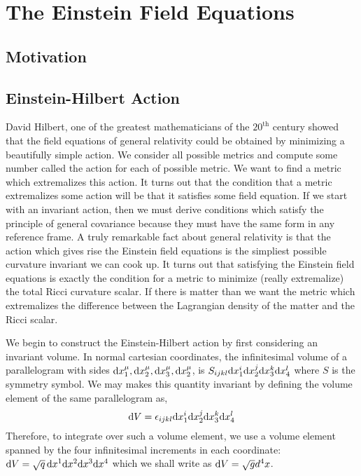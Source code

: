 \documentclass[11pt, a4paper]{article}
\begin{document}
\section{The Einstein Field Equations}

\subsection{Motivation}

\subsection{Einstein-Hilbert Action}

David Hilbert, one of the greatest mathematicians of the $20^{\mathrm{th}}$ century showed that the field equations of general relativity could be obtained by minimizing a beautifully simple action. We consider all possible metrics and compute some number called the action for each of possible metric. We want to find a metric which extremalizes this action. It turns out that the condition that a metric extremalizes some action will be that it satisfies some field equation. If we start with an invariant action, then we must derive conditions which satisfy the principle of general covariance because they must have the same form in any reference frame. A truly remarkable fact about general relativity is that the action which gives rise the Einstein field equations is the simpliest possible curvature invariant we can cook up. It turns out that satisfying the Einstein field equations is exactly the condition for a metric to minimize (really extremalize) the total Ricci curvature scalar. If there is matter than we want the metric which extremalizes the difference between the Lagrangian density of the matter and the Ricci scalar.
\par   
We begin to construct the Einstein-Hilbert action by first considering an invariant volume.  In normal cartesian coordinates, the infinitesimal volume of a parallelogram with sides $\mathrm{d}x_1^\mu, \mathrm{d}x_2^\mu, \mathrm{d}x_3^\mu, \mathrm{d}x_2^\mu$, is $S_{ijkl} \mathrm{d}x_1^i \mathrm{d}x_2^j \mathrm{d}x_3^k \mathrm{d}x_4^l$ where $S$ is the symmetry symbol.  We may makes this quantity invariant by defining the volume element of the same parallelogram as, 
\[\mathrm{d}V = \epsilon_{ijkl} \mathrm{d}x_1^i \mathrm{d}x_2^j \mathrm{d}x_3^k \mathrm{d}x_4^l\]
Therefore, to integrate over such a volume element, we use a volume element spanned by the four infinitesimal increments in each coordinate: $\mathrm{d}V = \sqrt{q} \, \mathrm{d}x^1\mathrm{d}x^2 \mathrm{d}x^3 \mathrm{d}x^4$ which we shall write as $\mathrm{d}V = \sqrt{g} d^4 x$.
\end{document}
